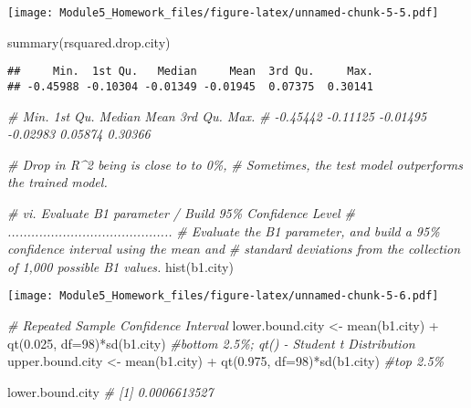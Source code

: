 \documentclass[
]{article}
\newenvironment{Shaded}{\begin{snugshade}}{\end{snugshade}}
\newcommand{\AttributeTok}[1]{\textcolor[rgb]{0.77,0.63,0.00}{#1}}
\newcommand{\CommentTok}[1]{\textcolor[rgb]{0.56,0.35,0.01}{\textit{#1}}}
\newcommand{\DecValTok}[1]{\textcolor[rgb]{0.00,0.00,0.81}{#1}}
\newcommand{\FloatTok}[1]{\textcolor[rgb]{0.00,0.00,0.81}{#1}}
\newcommand{\FunctionTok}[1]{\textcolor[rgb]{0.00,0.00,0.00}{#1}}
\newcommand{\NormalTok}[1]{#1}
\newcommand{\OtherTok}[1]{\textcolor[rgb]{0.56,0.35,0.01}{#1}}
\newcommand{\SpecialCharTok}[1]{\textcolor[rgb]{0.00,0.00,0.00}{#1}}
\begin{document}
\texttt{[image: Module5\_Homework\_files/figure-latex/unnamed-chunk-5-5.pdf]}

\begin{Shaded}
\begin{Highlighting}[]
\FunctionTok{summary}\NormalTok{(rsquared.drop.city)}
\end{Highlighting}
\end{Shaded}

\begin{verbatim}
##     Min.  1st Qu.   Median     Mean  3rd Qu.     Max. 
## -0.45988 -0.10304 -0.01349 -0.01945  0.07375  0.30141
\end{verbatim}

\begin{Shaded}
\begin{Highlighting}[]
    \CommentTok{\#    Min.    1st Qu.     Median      Mean    3rd Qu.     Max. }
    \CommentTok{\# {-}0.45442   {-}0.11125   {-}0.01495   {-}0.02983  0.05874    0.30366 }

    \CommentTok{\# Drop in R\^{}2 being is close to to 0\%,}
    \CommentTok{\# Sometimes, the test model outperforms the trained model. }



\CommentTok{\# vi. Evaluate B1 parameter / Build 95\% Confidence Level}
\CommentTok{\# ..........................................}
\CommentTok{\# Evaluate the B1 parameter, and build a 95\% confidence interval using the mean and }
\CommentTok{\# standard deviations from the collection of 1,000 possible B1 values.}
\FunctionTok{hist}\NormalTok{(b1.city)}
\end{Highlighting}
\end{Shaded}

\texttt{[image: Module5\_Homework\_files/figure-latex/unnamed-chunk-5-6.pdf]}

\begin{Shaded}
\begin{Highlighting}[]
\CommentTok{\# Repeated Sample Confidence Interval}
\NormalTok{lower.bound.city }\OtherTok{\textless{}{-}} \FunctionTok{mean}\NormalTok{(b1.city) }\SpecialCharTok{+} \FunctionTok{qt}\NormalTok{(}\FloatTok{0.025}\NormalTok{, }\AttributeTok{df=}\DecValTok{98}\NormalTok{)}\SpecialCharTok{*}\FunctionTok{sd}\NormalTok{(b1.city)   }\CommentTok{\#bottom 2.5\%; qt() {-} Student t Distribution}
\NormalTok{upper.bound.city }\OtherTok{\textless{}{-}} \FunctionTok{mean}\NormalTok{(b1.city) }\SpecialCharTok{+} \FunctionTok{qt}\NormalTok{(}\FloatTok{0.975}\NormalTok{, }\AttributeTok{df=}\DecValTok{98}\NormalTok{)}\SpecialCharTok{*}\FunctionTok{sd}\NormalTok{(b1.city)   }\CommentTok{\#top 2.5\%}

\NormalTok{lower.bound.city     }\CommentTok{\# [1] 0.0006613527}
\end{Highlighting}
\end{Shaded}
\end{document}
